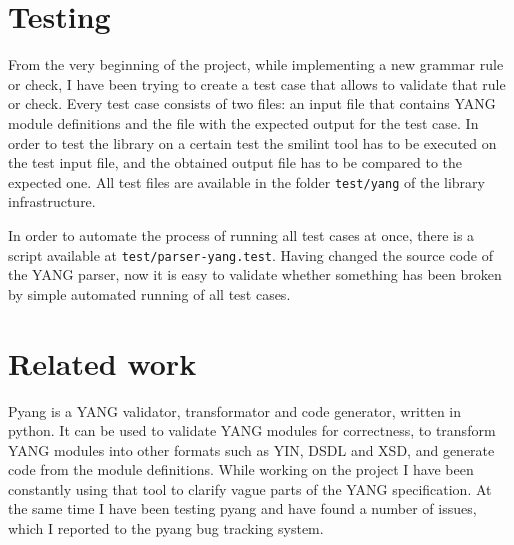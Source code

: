 \documentclass[conference]{IEEEtran}
\begin{document}
\section{Testing}
From the very beginning of the project,  while implementing a new grammar rule or check, I have been trying to create a test case that allows to validate that rule or check. 
Every test case consists of two files: an input file that contains YANG module definitions and the file with the expected output for the test case. 
In order to test the library on a certain test the smilint tool has to be executed on the test input file,
and the obtained output file has to be compared to the expected one. 
All test files are available in the folder 	\texttt{test/yang} of the library infrastructure.

In order to automate the process of running all test cases at once, there is a script available at \texttt{test/parser-yang.test}. 
Having changed the source code of the YANG parser, now it is easy to validate whether something has been broken by simple automated running of all test cases.

\section{Related work}
Pyang \cite{bib8} is a YANG validator, transformator and code generator, written in python.
It can be used to validate YANG modules for correctness, to transform YANG modules into other formats such as YIN, DSDL and XSD, 
and generate code from the module definitions. 
While working on the project I have been constantly using that tool to clarify vague parts of the YANG specification.
At the same time I have been testing pyang and have found a number of issues, which I reported to the pyang bug tracking system.
\end{document}
